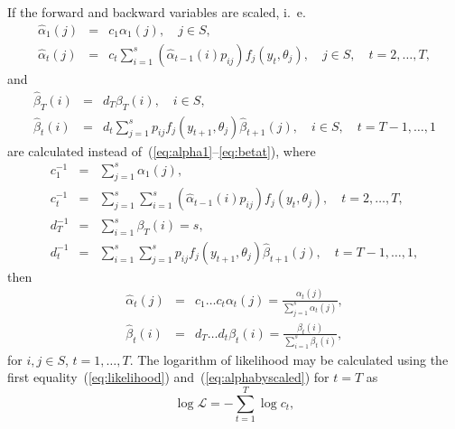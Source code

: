 \documentclass[a4paper,11pt]{article}
\begin{document}
If the forward and backward variables are scaled, i.~e.
\begin{eqnarray}
  \label{eq:alpha1scaled}
  \hat{\alpha}_1(j) & = & c_1 \alpha_1(j), \hspace{1em} j \in S, \\
  \label{eq:alphatscaled}
  \hat{\alpha}_t(j) & = & c_t \sum_{i = 1}^s (\hat{\alpha}_{t -
    1}(i)p_{ij}) f_j(y_t, \theta_j),
  \hspace{1em} j \in S, \hspace{1em} t = 2, \ldots, T,
\end{eqnarray}
and
\begin{eqnarray}
  \label{eq:betaTscaled}
  \hat{\beta}_T(i) & = & d_T \beta_T(i), \hspace{1em} i \in S, \\
  \label{eq:betatscaled}
  \hat{\beta}_t(i) & = & d_t \sum_{j = 1}^s p_{ij}f_j(y_{t + 1},
  \theta_j)\hat{\beta}_{t + 1}(j),
  \hspace{1em} i \in S, \hspace{1em} t = T - 1, \ldots, 1
\end{eqnarray}
are calculated instead of~(\ref{eq:alpha1}--\ref{eq:betat}), where
\begin{eqnarray}
  \label{eq:c1}
  c_1^{-1} & = & \sum_{j = 1}^s \alpha_1(j), \\
  \label{eq:ct}
  c_t^{-1} & = & \sum_{j = 1}^s \sum_{i = 1}^s (\hat{\alpha}_{t -
    1}(i)p_{ij}) f_j(y_t, \theta_j), \hspace{1em} t = 2, \ldots, T, \\
  \label{eq:dT}
  d_T^{-1} & = & \sum_{i = 1}^s \beta_T(i) = s, \\
  \label{eq:dt}
  d_t^{-1} & = & \sum_{i = 1}^s \sum_{j = 1}^s p_{ij}f_j(y_{t + 1},
  \theta_j)\hat{\beta}_{t + 1}(j),
  \hspace{1em} t = T - 1, \ldots, 1,
\end{eqnarray}
then
\begin{eqnarray}
  \label{eq:alphabyscaled}
  \hat{\alpha}_t(j) & = & c_1 \ldots c_t \alpha_t(j) =
  \frac{\alpha_t(j)}{\sum_{j = 1}^s \alpha_t(j)}, \\
  \label{eq:betabyscaled}
  \hat{\beta}_t(i) & = & d_T \ldots d_t \beta_t(i) =
  \frac{\beta_t(i)}{\sum_{i = 1}^s \beta_t(i)},
\end{eqnarray}
for $i, j \in S$, $t = 1, \ldots, T$. The logarithm of likelihood may be
calculated using the first equality~(\ref{eq:likelihood})
and~(\ref{eq:alphabyscaled}) for $t = T$ as
\begin{equation}
  \label{eq:loglikelihood}
  \log \mathcal{L} = - \sum_{t = 1}^T \log c_t,
\end{equation}
\end{document}
